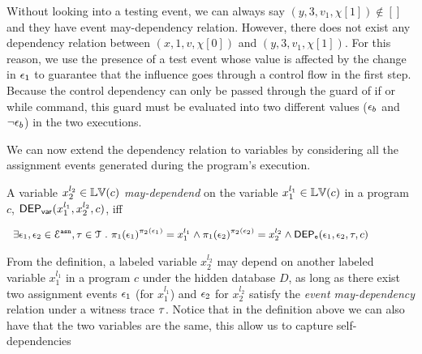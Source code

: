 Without looking into a testing event, we can always say $(y, 3, v_1, \chi[1]) \not\in []$ and they have event may-dependency relation.
However, there does not exist any dependency relation between $(x, 1, v, \chi[0])$ and $(y, 3, v_1, \chi[1])$.
For this reason, we use the presence of a test event whose value is affected by the change in $\mathtt{\epsilon}_1$
to guarantee that the influence goes through a control flow in the first step.
Because the control dependency can only be passed through the guard of if or while command, this guard must be evaluated into two different values ($\mathtt{\epsilon}_b$ and $\neg \mathtt{\epsilon}_b$) in the two executions.


We can now extend the dependency relation to variables by considering all the assignment events generated during the program’s execution. 

\begin{defn}
  \label{def:var_dep}
A variable ${x}_2^{l_2} \in \mathbb{LV}(c)$  \emph{may-dependend} on the 
  variable ${x}_1^{l_1} \in \mathbb{LV}(c)$ in a program ${c}$,
  $\mathsf{DEP_{var}}({x}_1^{l_1}, {x}_2^{l_2}, {c})$, iff
\begin{center}
$
{\small   \begin{array}{l}
\exists \event_1, \event_2 \in \eventset^{\asn}, \trace \in \mathcal{T} \st
\pi_{1}{(\event_1)}^{\pi_{2}{(\event_1)}} = {x}_1^{l_1}
\land
\pi_{1}{(\event_2)}^{\pi_{2}{(\event_2)}} = {x}_2^{l_2}%
\land 
\eventdep(\event_1, \event_2, \trace, c) 
  \end{array}
}%
$
\end{center}
  \end{defn}
{From the definition, a labeled variable $x_2^{l_2}$ may depend on another labeled variable $x_1^{l_1}$ in a program $c$ under the hidden database $D$, 
as long as there exist two assignment events $\mathtt{\epsilon}_1$ (for $x_1^{l_1}$) and $\mathtt{\epsilon}_2$ for $x_2^{l_2}$
satisfy the \emph{event may-dependency} relation under a witness trace $\mathtt{\tau}$.  
Notice that in the definition above we can also have that the two variables are the same,
this allow us to capture self-dependencies
}



